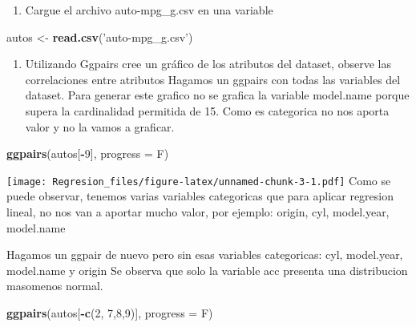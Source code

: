 \documentclass[]{article}
\newenvironment{Shaded}{\begin{snugshade}}{\end{snugshade}}
\newcommand{\DataTypeTok}[1]{\textcolor[rgb]{0.13,0.29,0.53}{#1}}
\newcommand{\DecValTok}[1]{\textcolor[rgb]{0.00,0.00,0.81}{#1}}
\newcommand{\KeywordTok}[1]{\textcolor[rgb]{0.13,0.29,0.53}{\textbf{#1}}}
\newcommand{\NormalTok}[1]{#1}
\newcommand{\OperatorTok}[1]{\textcolor[rgb]{0.81,0.36,0.00}{\textbf{#1}}}
\newcommand{\StringTok}[1]{\textcolor[rgb]{0.31,0.60,0.02}{#1}}
\providecommand{\tightlist}{%
  \setlength{\itemsep}{0pt}\setlength{\parskip}{0pt}}
\begin{document}
\begin{enumerate}
\def\labelenumi{\arabic{enumi}.}
\tightlist
\item
  Cargue el archivo auto-mpg\_g.csv en una variable
\end{enumerate}

\begin{Shaded}
\begin{Highlighting}[]
\NormalTok{autos <-}\StringTok{ }\KeywordTok{read.csv}\NormalTok{(}\StringTok{'auto-mpg_g.csv'}\NormalTok{)}
\end{Highlighting}
\end{Shaded}

\begin{enumerate}
\def\labelenumi{\arabic{enumi}.}
\setcounter{enumi}{1}
\tightlist
\item
  Utilizando Ggpairs cree un gráfico de los atributos del dataset,
  observe las correlaciones entre atributos Hagamos un ggpairs con todas
  las variables del dataset. Para generar este grafico no se grafica la
  variable model.name porque supera la cardinalidad permitida de 15.
  Como es categorica no nos aporta valor y no la vamos a graficar.
\end{enumerate}

\begin{Shaded}
\begin{Highlighting}[]
\KeywordTok{ggpairs}\NormalTok{(autos[}\OperatorTok{-}\DecValTok{9}\NormalTok{], }\DataTypeTok{progress =}\NormalTok{ F)}
\end{Highlighting}
\end{Shaded}

\texttt{[image: Regresion\_files/figure-latex/unnamed-chunk-3-1.pdf]}
Como se puede observar, tenemos varias variables categoricas que para
aplicar regresion lineal, no nos van a aportar mucho valor, por ejemplo:
origin, cyl, model.year, model.name

Hagamos un ggpair de nuevo pero sin esas variables categoricas: cyl,
model.year, model.name y origin Se observa que solo la variable acc
presenta una distribucion masomenos normal.

\begin{Shaded}
\begin{Highlighting}[]
\KeywordTok{ggpairs}\NormalTok{(autos[}\OperatorTok{-}\KeywordTok{c}\NormalTok{(}\DecValTok{2}\NormalTok{, }\DecValTok{7}\NormalTok{,}\DecValTok{8}\NormalTok{,}\DecValTok{9}\NormalTok{)], }\DataTypeTok{progress =}\NormalTok{ F)}
\end{Highlighting}
\end{Shaded}
\end{document}
